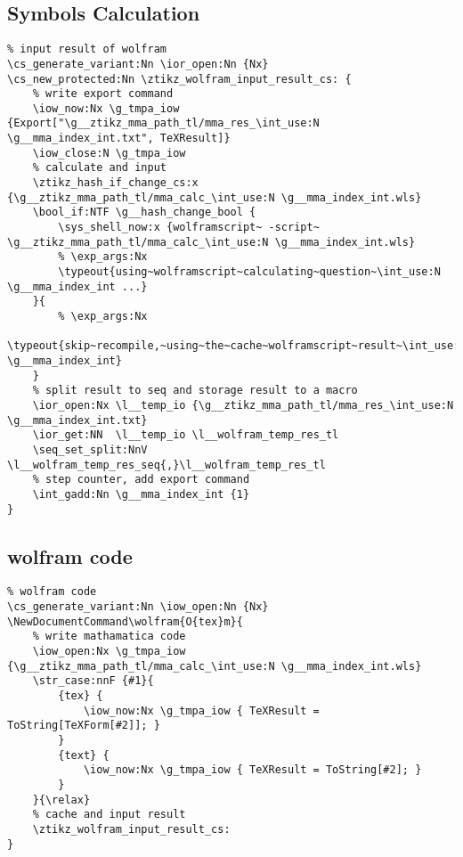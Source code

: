 \subsection{Symbols Calculation}
\begin{verbatim}
% input result of wolfram
\cs_generate_variant:Nn \ior_open:Nn {Nx}
\cs_new_protected:Nn \ztikz_wolfram_input_result_cs: {
    % write export command
    \iow_now:Nx \g_tmpa_iow {Export["\g__ztikz_mma_path_tl/mma_res_\int_use:N \g__mma_index_int.txt", TeXResult]}
    \iow_close:N \g_tmpa_iow
    % calculate and input
    \ztikz_hash_if_change_cs:x {\g__ztikz_mma_path_tl/mma_calc_\int_use:N \g__mma_index_int.wls}   
    \bool_if:NTF \g__hash_change_bool {
        \sys_shell_now:x {wolframscript~ -script~ \g__ztikz_mma_path_tl/mma_calc_\int_use:N \g__mma_index_int.wls}
        % \exp_args:Nx 
        \typeout{using~wolframscript~calculating~question~\int_use:N \g__mma_index_int ...}
    }{
        % \exp_args:Nx 
        \typeout{skip~recompile,~using~the~cache~wolframscript~result~\int_use:N \g__mma_index_int}
    }
    % split result to seq and storage result to a macro
    \ior_open:Nx \l__temp_io {\g__ztikz_mma_path_tl/mma_res_\int_use:N \g__mma_index_int.txt}
    \ior_get:NN  \l__temp_io \l__wolfram_temp_res_tl
    \seq_set_split:NnV \l__wolfram_temp_res_seq{,}\l__wolfram_temp_res_tl
    % step counter, add export command
    \int_gadd:Nn \g__mma_index_int {1}  
}
\end{verbatim}

\subsection{wolfram code}
\begin{verbatim}
% wolfram code
\cs_generate_variant:Nn \iow_open:Nn {Nx}
\NewDocumentCommand\wolfram{O{tex}m}{
    % write mathamatica code
    \iow_open:Nx \g_tmpa_iow {\g__ztikz_mma_path_tl/mma_calc_\int_use:N \g__mma_index_int.wls}
    \str_case:nnF {#1}{
        {tex} {
            \iow_now:Nx \g_tmpa_iow { TeXResult = ToString[TeXForm[#2]]; }
        }
        {text} {
            \iow_now:Nx \g_tmpa_iow { TeXResult = ToString[#2]; }
        }
    }{\relax}
    % cache and input result
    \ztikz_wolfram_input_result_cs:
}
\end{verbatim}

